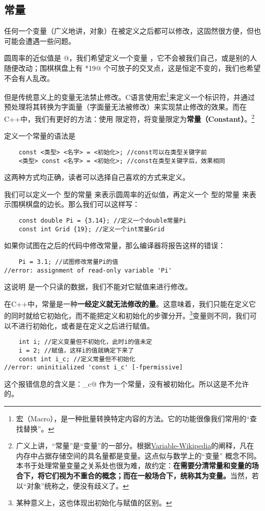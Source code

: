 \subsection*{常量}
任何一个变量（广义地讲，对象）在被定义之后都可以修改，这固然很方便，但也可能会遭遇一些问题。\par
圆周率的近似值是 @，我们希望定义一个变量 \lstinline@Pi@，它不会被我们自己，或是别的人随便改动；围棋棋盘上有 *19@ 个可放子的交叉点，这是恒定不变的，我们也希望不会有人乱改。\par
但是传统意义上的变量无法禁止修改。C语言使用宏\footnote{宏（Macro），是一种批量转换特定内容的方法。它的功能很像我们常用的``查找替换''。}来定义一个标识符，并通过预处理将其转换为字面量（字面量无法被修改）来实现禁止修改的效果。而在C++中，我们有更好的方法：使用 \lstinline@const@ 限定符，将变量限定为\textbf{常量（Constant）}。\footnote{广义上讲，``常量''是``变量''的一部分。根据\href{https://en.wikipedia.org/wiki/Variable_(computer_science)}{Variable-Wikipedia}的阐释，凡在内存中占据存储空间的具名量都是变量。这点似与数学上的``变量''   概念不同。本书于处理常量变量之关系处也很为难，故约定：\textbf{在需要分清常量和变量的场合下，将它们视为不重合的概念；而在一般场合下，统称其为变量。}当然，若以``对象''统称之，便没有歧义了。}\par
定义一个常量的语法是
\begin{lstlisting}
    const <类型> <名字> = <初始化>; //const可以在类型关键字前
    <类型> const <名字> = <初始化>; //const在类型关键字后，效果相同
\end{lstlisting}
这两种方式均正确，读者可以选择自己喜欢的方式来定义。\par
我们可以定义一个 \lstinline@double@ 型的常量 \lstinline@Pi@ 来表示圆周率的近似值，再定义一个 \lstinline@int@ 型的常量 \lstinline@Grid@ 来表示围棋棋盘的边长。那么我们可以这样写：
\begin{lstlisting}
    const double Pi = {3.14}; //定义一个double常量Pi
    const int Grid {19}; //定义一个int常量Grid
\end{lstlisting}
如果你试图在之后的代码中修改常量，那么编译器将报告这样的错误：
\begin{lstlisting}
    Pi = 3.1; //试图修改常量Pi的值
//error: assignment of read-only variable 'Pi'
\end{lstlisting}
这说明 \lstinline@Pi@ 是一个只读的数据，我们不能对它赋值来进行修改。\par
在C++中，常量是一种\textbf{一经定义就无法修改的量}。这意味着，我们只能在定义它的同时就给它初始化，而不能把定义和初始化的步骤分开。\footnote{某种意义上，这也体现出初始化与赋值的区别。}变量则不同，我们可以不进行初始化，或者是在定义之后进行赋值。
\begin{lstlisting}
    int i; //定义变量但不初始化，此时i的值未定
    i = 2; //赋值，这样i的值就确定下来了
    const int i_c; //定义常量但不初始化
//error: uninitialized 'const i_c' [-fpermissive]
\end{lstlisting}
这个报错信息的含义是：\lstinline@i_c@ 作为一个常量，没有被初始化。所以这是不允许的。\par
